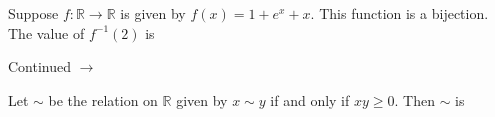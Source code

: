 \documentclass[addpoints]{exam}
\def\pageturn{\vfill
\begin{flushright}
	\begin{small}
		Continued $\rightarrow$
	\end{small}
\end{flushright}
\newpage}
\begin{document}
\begin{questions}


\question[2] Suppose $f: \mathbb{R} \rightarrow \mathbb{R}$ is given by $f(x) = 1 + e^x + x$. This function is a bijection. The value of $f^{-1}(2)$ is 

 	\pageturn



\question[2] Let $\sim$ be the relation on $\mathbb{R}$ given by $x \sim y$ if and only if $xy \geq 0$. Then $\sim$ is 
\end{questions}
\end{document}
